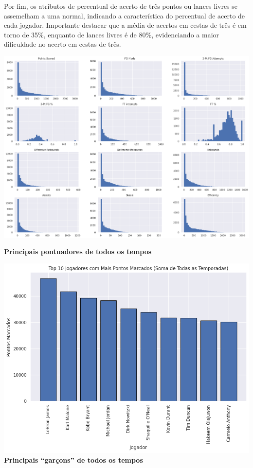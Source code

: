 \documentclass[
]{book}
\begin{document}
Por fim, os atributos de percentual de acerto de três pontos ou lances livres se assemelham a uma normal, indicando a característica do percentual de acerto de cada jogador. Importante destacar que a média de acertos em cestas de três é em torno de 35\%, enquanto de lances livres é de 80\%, evidenciando a maior dificuldade no acerto em cestas de três.

\includegraphics{imagens/15.png}

\textbf{Principais pontuadores de todos os tempos}

\includegraphics{imagens/16.png} \textbf{Principais ``garçons'' de todos os tempos}
\end{document}
